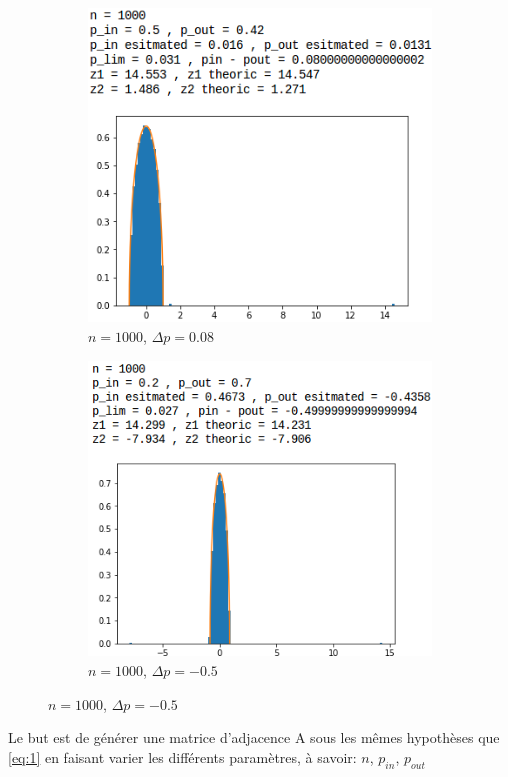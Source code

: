 \begin{figure}[p]
\begin{subfigure}{.5\textwidth}
		\includegraphics[scale=0.58]{static/spectral_n1000_pin05_pout042.png}
		\caption{$n=1000$, $\Delta p=0.08$}
		\label{n1000delta008}
	\end{subfigure}
	\begin{subfigure}{.5\textwidth}
		\centering
		\includegraphics[scale=0.58]{static/spectral_n1000_pin02_pout07.png}
		\caption{$n=1000$, $\Delta p=-0.5$}
		\label{n1000delta-05}
	\end{subfigure}
\end{figure}
Le but est de générer une matrice d'adjacence A sous les mêmes hypothèses que \eqref{eq:1} en faisant varier les différents paramètres, à savoir: $n$, $p_{in}$, $p_{out}$ \\

